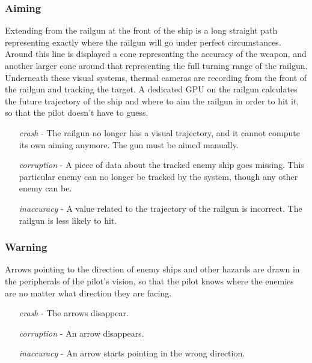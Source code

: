 \documentclass[a4paper]{article}
\begin{document}
\vspace{-0.5cm} \hspace{-18pt} \subsubsection{Aiming} \label{fighter_aiming} \vspace{-0.2cm}
Extending from the railgun at the front of the ship is a long straight path representing exactly where the railgun will go under perfect circumstances. Around this line is displayed a cone representing the accuracy of the weapon, and another larger cone around that representing the full turning range of the railgun. Underneath these visual systems, thermal cameras are recording from the front of the railgun and tracking the target. A dedicated GPU on the railgun calculates the future trajectory of the ship and where to aim the railgun in order to hit it, so that the pilot doesn't have to guess.
\begin{enumerate}[leftmargin=2cm]
\item [\textit{crash}] - The railgun no longer has a visual trajectory, and it cannot compute its own aiming anymore. The gun must be aimed manually.
\item [\textit{corruption}] - A piece of data about the tracked enemy ship goes missing. This particular enemy can no longer be tracked by the system, though any other enemy can be. 
\item [\textit{inaccuracy}] - A value related to the trajectory of the railgun is incorrect. The railgun is less likely to hit.
\end{enumerate}

\vspace{-0.5cm} \hspace{-18pt} \subsubsection{Warning} \label{fighter_warning} \vspace{-0.2cm}
Arrows pointing to the direction of enemy ships and other hazards are drawn in the peripherals of the pilot's vision, so that the pilot knows where the enemies are no matter what direction they are facing.
\begin{enumerate}[leftmargin=2cm]
\item [\textit{crash}] - The arrows disappear.
\item [\textit{corruption}] - An arrow disappears.
\item [\textit{inaccuracy}] - An arrow starts pointing in the wrong direction.
\end{enumerate}
\end{document}
